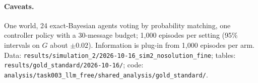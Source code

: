\documentclass[10pt,a4paper]{article}
\begin{document}
\paragraph{Caveats.} One world, 24 exact-Bayesian agents voting by probability matching, one controller policy
with a 30-message budget; 1{,}000 episodes per setting (95\% intervals on $G$ about $\pm0.02$). Information is
plug-in from 1{,}000 episodes per arm. Data: \texttt{results/simulation\_2/2026-10-16\_sim2\_nosolution\_fine}; tables:
\texttt{results/gold\_standard/2026-10-16/}; code: \texttt{analysis/task003\_llm\_free/shared\_analysis/gold\_standard/}.
\end{document}
